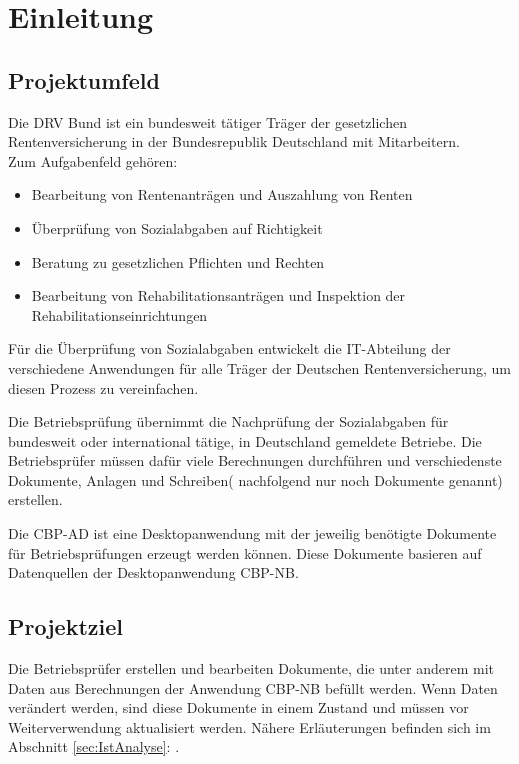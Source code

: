 
\section{Einleitung}
\label{sec:Einleitung}


\subsection{Projektumfeld} 
\label{sec:Projektumfeld}

Die \ac{DRV Bund} ist ein bundesweit tätiger Träger der gesetzlichen Rentenversicherung in der Bundesrepublik Deutschland
mit  Mitarbeitern.\\
Zum Aufgabenfeld gehören:
\begin{itemize}
	\item Bearbeitung von Rentenanträgen und Auszahlung von Renten
	\item Überprüfung von Sozialabgaben auf Richtigkeit
	\item Beratung zu gesetzlichen Pflichten und Rechten
	\item Bearbeitung von Rehabilitationsanträgen und Inspektion der Rehabilitationseinrichtungen
\end{itemize}

Für die Überprüfung von Sozialabgaben entwickelt die IT-Abteilung der \DRV verschiedene Anwendungen für alle Träger der Deutschen Rentenversicherung, um diesen Prozess zu vereinfachen.

Die Betriebsprüfung übernimmt die Nachprüfung der Sozialabgaben für bundesweit oder international tätige, in Deutschland gemeldete Betriebe. Die Betriebsprüfer müssen dafür viele Berechnungen durchführen und verschiedenste Dokumente, Anlagen und Schreiben( nachfolgend nur noch Dokumente genannt) erstellen.

Die \ac{CBP-AD} ist eine Desktopanwendung mit der jeweilig benötigte Dokumente für Betriebsprüfungen erzeugt werden können. Diese Dokumente basieren auf Datenquellen der Desktopanwendung \ac{CBP-NB}.


\subsection{Projektziel} 
\label{sec:Projektziel}

Die Betriebsprüfer erstellen und bearbeiten Dokumente, die unter anderem mit Daten aus Berechnungen der Anwendung \acs{CBP-NB} befüllt werden. Wenn Daten verändert werden, sind diese Dokumente in einem  Zustand und müssen vor Weiterverwendung aktualisiert werden. Nähere Erläuterungen befinden sich im Abschnitt \ref{sec:IstAnalyse}: .

